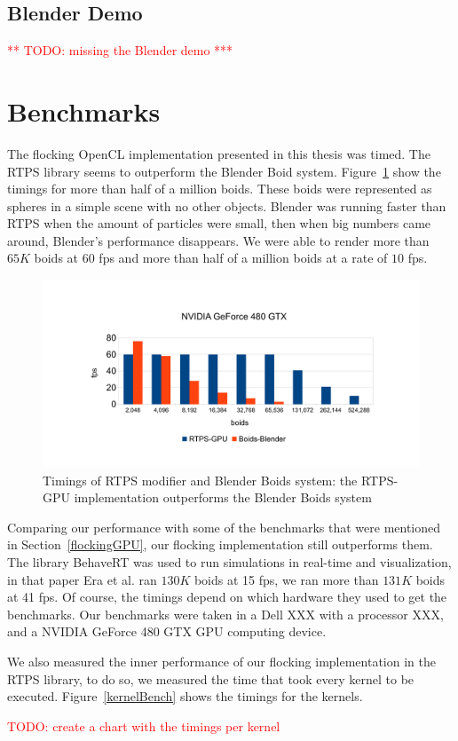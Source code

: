 \subsection{Blender Demo}
\textcolor{red}{** TODO: missing the Blender demo ***}

\section{Benchmarks}

The flocking OpenCL implementation presented in this thesis was timed. The RTPS library seems to outperform the Blender Boid system. Figure~\ref{plot} show the timings for more than half of a million boids. These boids were represented as spheres in a simple scene with no other objects. Blender was running faster than RTPS when the amount of particles were small, then when big numbers came around, Blender's performance disappears.  We were able to render more than $65K$ boids at $60$ fps and more than half of a million boids at a rate of $10$ fps.

\begin{figure}[htbp]
\begin{center}
\includegraphics[scale=0.45]{figures/benchmarks.pdf}
\caption{Timings of RTPS modifier and Blender Boids system: the RTPS-GPU implementation outperforms the Blender Boids system}
\label{plot}
\end{center}
\end{figure}

Comparing our performance with some of the benchmarks that were mentioned in Section~\ref{flockingGPU}, our flocking implementation still outperforms them. The library BehaveRT was used to run simulations in real-time and visualization, in that paper Era et al. ran $130K$ boids at 15 fps, we ran more than $131K$ boids at 41 fps. Of course, the timings depend on which hardware they used to get the benchmarks. Our benchmarks were taken in a Dell XXX with a processor XXX, and a NVIDIA GeForce 480 GTX GPU computing device. 

We also measured the inner performance of our flocking implementation in the RTPS library, to do so, we measured the time that took every kernel to be executed. Figure~\ref{kernelBench} shows the timings for the kernels.

\textcolor{red}{TODO: create a chart with the timings per kernel}



